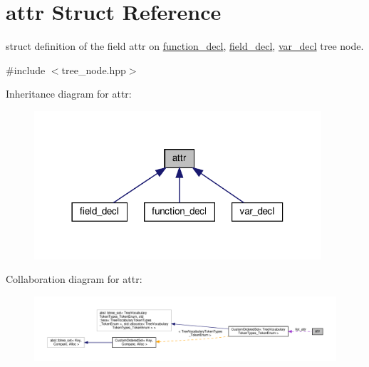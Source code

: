 \hypertarget{structattr}{}\section{attr Struct Reference}
\label{structattr}


struct definition of the field attr on \hyperlink{structfunction__decl}{function\+\_\+decl}, \hyperlink{structfield__decl}{field\+\_\+decl}, \hyperlink{structvar__decl}{var\+\_\+decl} tree node.  




{\ttfamily \#include $<$tree\+\_\+node.\+hpp$>$}



Inheritance diagram for attr\+:
\nopagebreak
\begin{figure}[H]
\begin{center}
\leavevmode
\includegraphics[width=302pt]{d4/dd0/structattr__inherit__graph}
\end{center}
\end{figure}


Collaboration diagram for attr\+:
\nopagebreak
\begin{figure}[H]
\begin{center}
\leavevmode
\includegraphics[width=350pt]{d2/dcd/structattr__coll__graph}
\end{center}
\end{figure}
